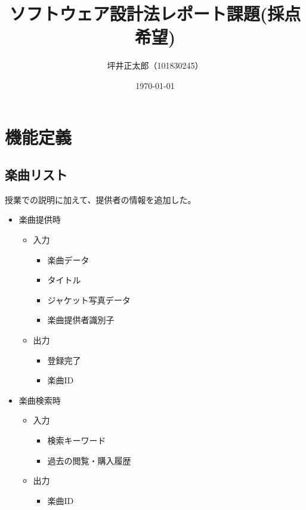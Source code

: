 \documentclass[a4paper,10pt]{jsarticle}
\begin{document}
\title{ソフトウェア設計法レポート課題(採点希望)}
\author{坪井正太郎（101830245）}
\date{\today}
\maketitle
\section{機能定義}
\subsection{楽曲リスト}
授業での説明に加えて、提供者の情報を追加した。
\begin{itemize}
  \item 楽曲提供時
        \begin{itemize}
          \item 入力
                \begin{itemize}
                  \item 楽曲データ
                  \item タイトル
                  \item ジャケット写真データ
                  \item 楽曲提供者識別子
                \end{itemize}
          \item 出力
                \begin{itemize}
                  \item 登録完了
                  \item 楽曲ID
                \end{itemize}
        \end{itemize}
  \item 楽曲検索時
        \begin{itemize}
          \item 入力
                \begin{itemize}
                  \item 検索キーワード
                  \item 過去の閲覧・購入履歴
                \end{itemize}
          \item 出力
                \begin{itemize}
                  \item 楽曲ID
                \end{itemize}
        \end{itemize}
\end{itemize}
\end{document}
